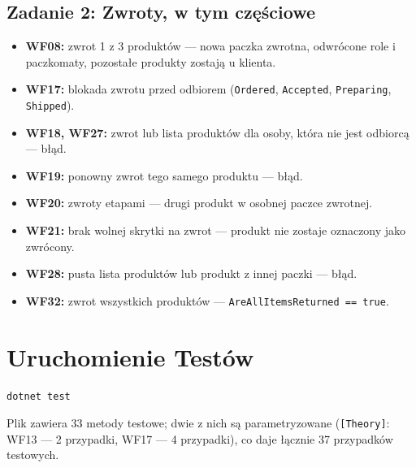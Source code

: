 \documentclass[10.5pt,a4paper]{article}
\begin{document}
\subsection{Zadanie 2: Zwroty, w tym częściowe}
\begin{itemize}[leftmargin=*,itemsep=1.5pt]
    \item \textbf{WF08:} zwrot 1 z 3 produktów --- nowa paczka zwrotna, odwrócone role i paczkomaty, pozostałe produkty zostają u klienta.
    \item \textbf{WF17:} blokada zwrotu przed odbiorem (\texttt{Ordered}, \texttt{Accepted}, \texttt{Preparing}, \texttt{Shipped}).
    \item \textbf{WF18, WF27:} zwrot lub lista produktów dla osoby, która nie jest odbiorcą --- błąd.
    \item \textbf{WF19:} ponowny zwrot tego samego produktu --- błąd.
    \item \textbf{WF20:} zwroty etapami --- drugi produkt w osobnej paczce zwrotnej.
    \item \textbf{WF21:} brak wolnej skrytki na zwrot --- produkt nie zostaje oznaczony jako zwrócony.
    \item \textbf{WF28:} pusta lista produktów lub produkt z innej paczki --- błąd.
    \item \textbf{WF32:} zwrot wszystkich produktów --- \texttt{AreAllItemsReturned == true}.
\end{itemize}

\section{Uruchomienie Testów}

\begin{lstlisting}
dotnet test
\end{lstlisting}

Plik zawiera 33 metody testowe; dwie z nich są parametryzowane (\texttt{[Theory]}: WF13 --- 2 przypadki, WF17 --- 4 przypadki), co daje łącznie 37 przypadków testowych.
\end{document}
